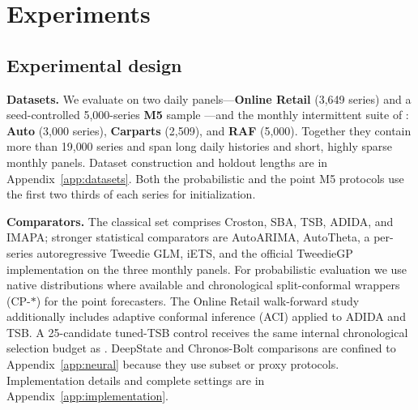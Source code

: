 
\section{Experiments}\label{sec:experiments}

\subsection{Experimental design}\label{sec:setup}

\textbf{Datasets.} We evaluate on two daily panels---\textbf{Online
Retail} \citep{chen2015} (3{,}649 series) and a seed-controlled
5{,}000-series \textbf{M5} sample \citep{makridakis2022}---and the
monthly intermittent suite of \citet{damato2025}: \textbf{Auto}
(3{,}000 series), \textbf{Carparts} (2{,}509), and \textbf{RAF}
(5{,}000). Together they contain more than 19{,}000 series and span
long daily histories and short, highly sparse monthly panels. Dataset
construction and holdout lengths are in Appendix~\ref{app:datasets}.
Both the probabilistic and the point M5 protocols use the first two
thirds of each series for initialization.

\textbf{Comparators.} The classical set comprises Croston, SBA, TSB,
ADIDA, and IMAPA; stronger statistical comparators are AutoARIMA,
AutoTheta, a per-series autoregressive Tweedie GLM, iETS, and the official
TweedieGP implementation on the three monthly panels. For probabilistic
evaluation we use native distributions where available and chronological
split-conformal wrappers (CP-$\ast$) for the point forecasters. The
Online Retail walk-forward study additionally includes adaptive conformal
inference (ACI) applied to ADIDA and TSB. A 25-candidate tuned-TSB control
receives the same internal chronological selection budget as \REMIX{}.
DeepState and Chronos-Bolt comparisons are confined to
Appendix~\ref{app:neural} because they use subset or proxy protocols.
Implementation details and complete settings are in
Appendix~\ref{app:implementation}.

